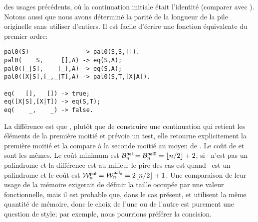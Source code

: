 des usages précédents, où la continuation initiale était l'identité
(comparer avec ). Notons aussi que nous avons déterminé
la parité de la longueur de la pile originelle sans utiliser
d'entiers. Il est facile d'écrire une fonction équivalente du premier
ordre:
\begin{verbatim}
pal0(S)               -> pal0(S,S,[]).
pal0(    S,     [],A) -> eq(S,A);
pal0([_|S],    [_],A) -> eq(S,A);
pal0([X|S],[_,_|T],A) -> pal0(S,T,[X|A]).

eq(   [],   []) -> true;
eq([X|S],[X|T]) -> eq(S,T);
eq(    _,    _) -> false.
\end{verbatim}
La différence est que , plutôt que de construire une
continuation qui retient les éléments de la première moitié et prévoie
un test, elle retourne explicitement la première moitié et la compare
à la seconde moitié au moyen de . Le coût de
 et  sont les mêmes. Le coût minimum
est \(\B{\fun{pal}}{n} = \B{\fun{pal0}}{n} = \floor{n/2} + 2\), si
~n'est pas un palindrome et la différence est au milieu; le
pire des cas est quand ~est un palindrome et le coût est
\(\W{\fun{pal}}{n} = \W{\fun{pal}_0}{n} = 2\floor{n/2} +
1\). Une comparaison de leur usage de la mémoire
exigerait de définir la taille occupée par une valeur fonctionnelle,
mais il est probable que, dans le cas présent,  et
 utilisent la même quantité de mémoire, donc le choix
de l'une ou de l'autre est purement une question de style; par
exemple, nous pourrions préférer la concision.

